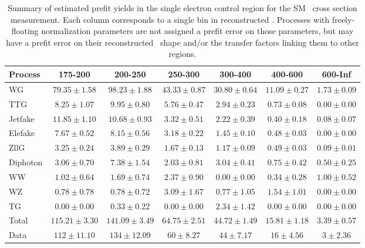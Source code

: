 \begin{table}[htbp]
  \begin{center}
    \caption{Summary of estimated prefit yields in the single electron control region for the SM \zinvg\ cross section measurement.
    Each column corresponds to a single bin in reconstructed \ETgamma. Processes with freely-floating normalization parameters
    are not assigned a prefit error on those parameters, but may have a prefit error on their reconstructed \ETgamma\ shape
    and/or the transfer factors linking them to other regions.}
    \label{tab:BkgSummaryMonoel_prefit}
    \begin{tabular}{|l|c|c|c|c|c|c|}
      \hline
      Process & 175-200 & 200-250 & 250-300 & 300-400 & 400-600 & 600-Inf \\
      \hline
      WG & $79.35{\pm}1.58$ & $98.23{\pm}1.88$ & $43.33{\pm}0.87$ & $30.80{\pm}0.64$ & $11.09{\pm}0.27$ & $1.73{\pm}0.09$ \\
      TTG & $8.25{\pm}1.07$ & $9.95{\pm}0.80$ & $5.76{\pm}0.47$ & $2.94{\pm}0.23$ & $0.73{\pm}0.08$ & $0.00{\pm}0.00$ \\
      Jetfake & $11.85{\pm}1.10$ & $10.68{\pm}0.93$ & $3.32{\pm}0.51$ & $2.22{\pm}0.39$ & $0.40{\pm}0.18$ & $0.08{\pm}0.07$ \\
      Elefake & $7.67{\pm}0.52$ & $8.15{\pm}0.56$ & $3.18{\pm}0.22$ & $1.45{\pm}0.10$ & $0.48{\pm}0.03$ & $0.00{\pm}0.00$ \\
      ZllG & $3.25{\pm}0.24$ & $3.89{\pm}0.29$ & $1.67{\pm}0.13$ & $1.17{\pm}0.09$ & $0.49{\pm}0.03$ & $0.09{\pm}0.01$ \\
      Diphoton & $3.06{\pm}0.70$ & $7.38{\pm}1.54$ & $2.03{\pm}0.81$ & $3.04{\pm}0.41$ & $0.75{\pm}0.42$ & $0.50{\pm}0.25$ \\
      WW & $1.02{\pm}0.64$ & $1.69{\pm}0.74$ & $2.37{\pm}0.90$ & $0.00{\pm}0.00$ & $0.34{\pm}0.28$ & $1.00{\pm}0.52$ \\
      WZ & $0.78{\pm}0.78$ & $0.78{\pm}0.72$ & $3.09{\pm}1.67$ & $0.77{\pm}1.05$ & $1.54{\pm}1.01$ & $0.00{\pm}0.00$ \\
      TG & $0.00{\pm}0.00$ & $0.33{\pm}0.22$ & $0.00{\pm}0.00$ & $2.34{\pm}1.42$ & $0.00{\pm}0.00$ & $0.00{\pm}0.00$ \\
      \hline
      Total & $115.21{\pm}3.30$ & $141.09{\pm}3.49$ & $64.75{\pm}2.51$ & $44.72{\pm}1.49$ & $15.81{\pm}1.18$ & $3.39{\pm}0.57$ \\
      \hline
      Data & $112{\pm}11.10$ & $134{\pm}12.09$ & $60{\pm}8.27$ & $44{\pm}7.17$ & $16{\pm}4.56$ & $3{\pm}2.36$ \\
      \hline
    \end{tabular}
  \end{center}
\end{table}


